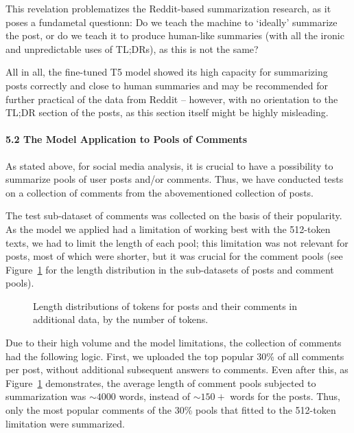 This revelation problematizes the Reddit-based summarization research, as it poses a fundametal questionn: Do we teach the machine to ‘ideally’ summarize the post, or do we teach it to produce human-like summaries (with all the ironic and unpredictable uses of TL;DRs), as this is not the same?

All in all, the fine-tuned T5 model showed its high capacity for summarizing posts correctly and close to human summaries and may be recommended for further practical of the data from Reddit -- however, with no orientation to the TL;DR section of the posts, as this section itself might be highly misleading.

\paragraph{5.2 The Model Application to Pools of Comments}
As stated above, for social media analysis, it is crucial to have a possibility to summarize pools of user posts and/or comments. Thus, we have conducted tests on a collection of comments from the abovementioned collection of posts.

The test sub-dataset of comments was collected on the basis of their popularity. As the model we applied had a limitation of working best with the 512-token texts, we had to limit the length of each pool; this limitation was not relevant for posts, most of which were shorter, but it was crucial for the comment pools (see Figure~\cref{fig:postLengthDistributionByNumber} for the length distribution in the sub-datasets of posts and comment pools).

\begin{figure}[ht]
	\caption{Length distributions of tokens for posts and their comments in additional data, by the number of tokens.}\label{fig:postLengthDistributionByNumber}
\end{figure}

Due to their high volume and the model limitations, the collection of comments had the following logic. First, we uploaded the top popular 30\% of all comments per post, without additional subsequent answers to comments. Even after this, as Figure~\cref{fig:postLengthDistributionByNumber} demonstrates, the average length of comment pools subjected to summarization was \(\sim4000\) words, instead of \(\sim150+\) words for the posts. Thus, only the most popular comments of the 30\% pools that fitted to the 512-token limitation were summarized.

